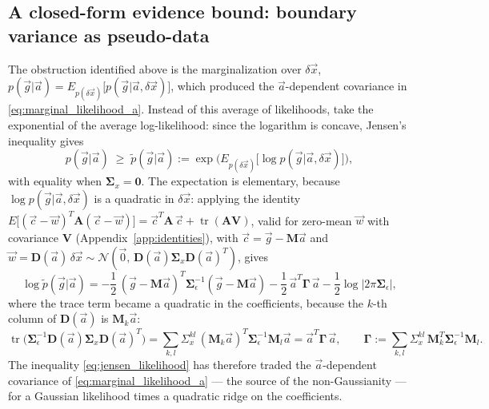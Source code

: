 \documentclass{article}
\begin{document}
\subsection{A closed-form evidence bound: boundary variance as pseudo-data} \label{sec:evidence_bound}
The obstruction identified above is the marginalization over $\delta\vec x$, $p(\vec g|\vec a) = E_{p(\delta\vec x)}\big[p(\vec g|\vec a, \delta\vec x)\big]$, which produced the $\vec a$-dependent covariance in \eqref{eq:marginal_likelihood_a}. Instead of this average of likelihoods, take the exponential of the average log-likelihood: since the logarithm is concave, Jensen's inequality gives
\begin{equation}
    p(\vec g|\vec a) \;\ge\; \tilde p(\vec g|\vec a) := \exp\Big(E_{p(\delta\vec x)}\big[\log p(\vec g|\vec a, \delta\vec x)\big]\Big), \label{eq:jensen_likelihood}
\end{equation}
with equality when $\mathbf{\Sigma}_x = \mathbf 0$. The expectation is elementary, because $\log p(\vec g|\vec a, \delta\vec x)$ is a quadratic in $\delta\vec x$: applying the identity $E\big[(\vec c-\vec w)^T\mathbf A(\vec c-\vec w)\big] = \vec c^T\mathbf A\,\vec c + \operatorname{tr}(\mathbf A\mathbf V)$, valid for zero-mean $\vec w$ with covariance $\mathbf V$ (Appendix~\ref{app:identities}), with $\vec c = \vec g - \mathbf M\vec a$ and $\vec w = \mathbf D(\vec a)\,\delta\vec x \sim \mathcal N(\vec 0,\, \mathbf D(\vec a)\mathbf{\Sigma}_x\mathbf D(\vec a)^T)$, gives
\begin{equation} \label{eq:augmented_loglik_a}
    \log \tilde p(\vec g|\vec a) = -\frac12\,(\vec g - \mathbf M\vec a)^T\mathbf{\Sigma}_\epsilon^{-1}(\vec g - \mathbf M\vec a) - \frac12\,\vec a^T\mathbf\Gamma\,\vec a - \frac12\log\big|2\pi\mathbf{\Sigma}_\epsilon\big|,
\end{equation}
where the trace term became a quadratic in the coefficients, because the $k$-th column of $\mathbf D(\vec a)$ is $\mathbf M_k\vec a$:
\begin{equation}
    \operatorname{tr}\big(\mathbf{\Sigma}_\epsilon^{-1}\mathbf D(\vec a)\mathbf{\Sigma}_x\mathbf D(\vec a)^T\big) = \sum_{k,l}\Sigma_x^{kl}\,(\mathbf M_k\vec a)^T\mathbf{\Sigma}_\epsilon^{-1}\mathbf M_l\vec a = \vec a^T\mathbf\Gamma\,\vec a,
    \qquad
    \mathbf\Gamma := \sum_{k,l}\Sigma_x^{kl}\,\mathbf M_k^T\mathbf{\Sigma}_\epsilon^{-1}\mathbf M_l. \label{eq:Gamma_x}
\end{equation}
The inequality \eqref{eq:jensen_likelihood} has therefore traded the $\vec a$-dependent covariance of \eqref{eq:marginal_likelihood_a} --- the source of the non-Gaussianity --- for a Gaussian likelihood times a quadratic ridge on the coefficients.
\end{document}
